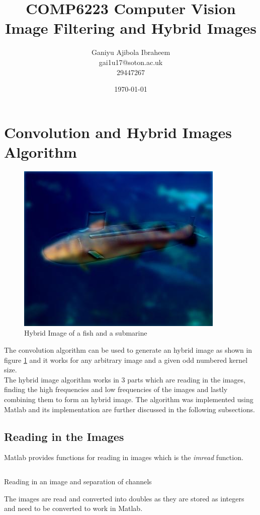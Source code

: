 \documentclass[a4paper,12pt]{article}
\begin{document}
	
\begin{titlepage}
	\title{
		COMP6223 Computer Vision \\
		\large Image Filtering and Hybrid Images
	}
	\date{\today}
	\author{
		Ganiyu Ajibola Ibraheem \\
		\large gai1u17@soton.ac.uk \\
			29447267
	}
\end{titlepage}

\maketitle
\newpage
{}
\tableofcontents
\newpage
\listoffigures

\listoflistings
\newpage
{}


\section{Convolution and Hybrid Images Algorithm}
\begin{figure}[h!]
	\centering
	\includegraphics[width=0.35\linewidth]{images/fish_submarine}
	\caption{Hybrid Image of a fish and a submarine}
	\label{fig:fish_submarine}
\end{figure}
The convolution algorithm can be used to generate an hybrid image as shown in figure \ref{fig:fish_submarine} and it works for any arbitrary image and a given odd numbered kernel size. \\

The hybrid image algorithm works in 3 parts which are reading in the images, finding the high frequencies and low frequencies of the images and lastly combining them to form an hybrid image. The algorithm was implemented using Matlab and its implementation are further discussed in the following subsections.

	\subsection{Reading in the Images}
	Matlab provides functions for reading in images which is the \textit{imread} function. 
	\begin{listing}[htbp!]
		\inputminted[breaklines=true,breakautoindent=true,firstline=9,lastline=14]{matlab}{minty_matlab.m}
		\caption{Reading in an image and separation of channels}
		\label{code:algebraic} 
	\end{listing}
	The images are read and converted into doubles as they are stored as integers and need to be converted to work in Matlab.
	
\end{document}

